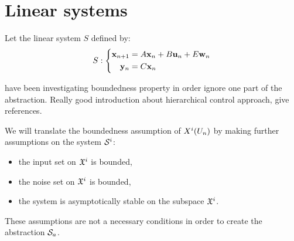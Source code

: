\newcommand{\xinf}{\underline{\vect{x}}}%
\newcommand{\xsup}{\overline{\vect{x}}}%
\newcommand{\xinit}{\vect{x}_0}%
\newcommand{\traj}{\varphi}%
\newcommand{\xn}{\vect{x}_n}%
\newcommand{\un}{\vect{u}_n}%
\newcommand{\wn}{\vect{w}_n}%
\newcommand{\yn}{\vect{y}_n}%
\newcommand{\xnn}{\vect{x}_{n+1}}%
\newcommand{\Sproc}{$\mathcal{S}$-procedure}%
%
\section{Linear systems}
Let the linear system $S$ defined by:
\begin{equation} \label{lin_sys}
S:
\left\{
\begin{aligned}
\xnn &= A \xn + B \un + E \wn \\
\yn &= C \xn
\end{aligned}
\right.
\end{equation}

\cite{liu2014abstraction} have been investigating boundedness property in order ignore one part of the abstraction.
Really good introduction about hierarchical control approach, give references.


We will translate the boundedness assumption of $X^i(U_n)$ by making further assumptions on the system $\mathcal{S}^i$:
\begin{itemize}[noitemsep,nolistsep]
\item the input set on $\mathfrak{X}^i$ is bounded,
\item the noise set on $\mathfrak{X}^i$ is bounded,
\item the system is asymptotically stable on the subspace $\mathfrak{X}^i$.
\end{itemize}
These assumptions are not a necessary conditions in order to create the abstraction $\mathcal{S}_a$.

